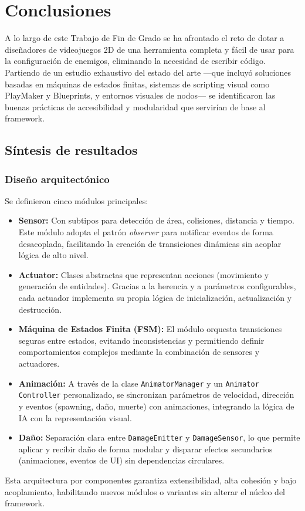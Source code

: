 \chapter{Conclusiones}


A lo largo de este Trabajo de Fin de Grado se ha afrontado el reto de dotar a diseñadores de videojuegos 2D de una herramienta completa y fácil de usar para la configuración de enemigos, eliminando la necesidad de escribir código. Partiendo de un estudio exhaustivo del estado del arte —que incluyó soluciones basadas en máquinas de estados finitas, sistemas de scripting visual como PlayMaker y Blueprints, y entornos visuales de nodos— se identificaron las buenas prácticas de accesibilidad y modularidad que servirían de base al framework.

\section{Síntesis de resultados}

\subsection{Diseño arquitectónico}
Se definieron cinco módulos principales:  
\begin{itemize}
  \item \textbf{Sensor:} Con subtipos para detección de área, colisiones, distancia y tiempo. Este módulo adopta el patrón \textit{observer} para notificar eventos de forma desacoplada, facilitando la creación de transiciones dinámicas sin acoplar lógica de alto nivel.  
  \item \textbf{Actuator:} Clases abstractas que representan acciones (movimiento y generación de entidades). Gracias a la herencia y a parámetros configurables, cada actuador implementa su propia lógica de inicialización, actualización y destrucción.  
  \item \textbf{Máquina de Estados Finita (FSM):} El módulo orquesta transiciones seguras entre estados, evitando inconsistencias y permitiendo definir comportamientos complejos mediante la combinación de sensores y actuadores.  
  \item \textbf{Animación:} A través de la clase \texttt{AnimatorManager} y un \texttt{Animator Controller} personalizado, se sincronizan parámetros de velocidad, dirección y eventos (spawning, daño, muerte) con animaciones, integrando la lógica de IA con la representación visual.  
  \item \textbf{Daño:} Separación clara entre \texttt{DamageEmitter} y \texttt{DamageSensor}, lo que permite aplicar y recibir daño de forma modular y disparar efectos secundarios (animaciones, eventos de UI) sin dependencias circulares.  
\end{itemize}
Esta arquitectura por componentes garantiza extensibilidad, alta cohesión y bajo acoplamiento, habilitando nuevos módulos o variantes sin alterar el núcleo del framework.

